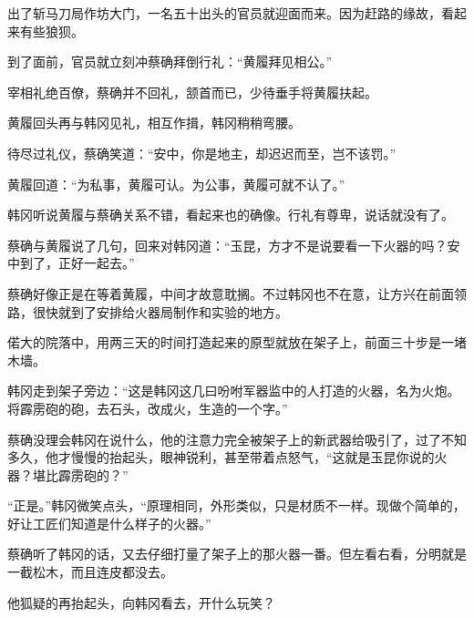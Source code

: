 出了斩马刀局作坊大门，一名五十出头的官员就迎面而来。因为赶路的缘故，看起来有些狼狈。

到了面前，官员就立刻冲蔡确拜倒行礼：“黄履拜见相公。”

宰相礼绝百僚，蔡确并不回礼，颔首而已，少待垂手将黄履扶起。

黄履回头再与韩冈见礼，相互作揖，韩冈稍稍弯腰。

待尽过礼仪，蔡确笑道：“安中，你是地主，却迟迟而至，岂不该罚。”

黄履回道：“为私事，黄履可认。为公事，黄履可就不认了。”

韩冈听说黄履与蔡确关系不错，看起来也的确像。行礼有尊卑，说话就没有了。

蔡确与黄履说了几句，回来对韩冈道：“玉昆，方才不是说要看一下火器的吗？安中到了，正好一起去。”

蔡确好像正是在等着黄履，中间才故意耽搁。不过韩冈也不在意，让方兴在前面领路，很快就到了安排给火器局制作和实验的地方。

偌大的院落中，用两三天的时间打造起来的原型就放在架子上，前面三十步是一堵木墙。

韩冈走到架子旁边：“这是韩冈这几曰吩咐军器监中的人打造的火器，名为火炮。将霹雳砲的砲，去石头，改成火，生造的一个字。”

蔡确没理会韩冈在说什么，他的注意力完全被架子上的新武器给吸引了，过了不知多久，他才慢慢的抬起头，眼神锐利，甚至带着点怒气，“这就是玉昆你说的火器？堪比霹雳砲的？”

“正是。”韩冈微笑点头，“原理相同，外形类似，只是材质不一样。现做个简单的，好让工匠们知道是什么样子的火器。”

蔡确听了韩冈的话，又去仔细打量了架子上的那火器一番。但左看右看，分明就是一截松木，而且连皮都没去。

他狐疑的再抬起头，向韩冈看去，开什么玩笑？

